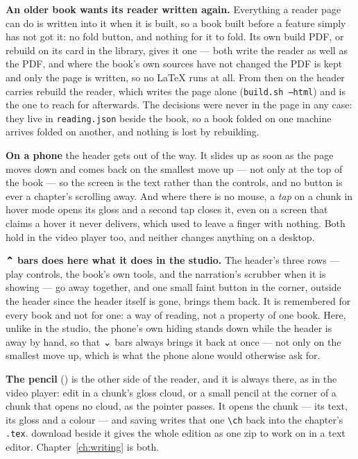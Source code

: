 \documentclass[11pt,oneside]{report}
\newcommand{\sym}[1]{{\symfont #1}}
\newcommand{\file}[1]{\texttt{#1}}
\newcommand{\key}[1]{\textsf{\small\fbox{#1}}}
\newcommand{\menu}[1]{\textsf{#1}}
\begin{document}
\textbf{An older book wants its reader written again.} Everything a reader
page can do is written into it when it is built, so a book built before a
feature simply has not got it: no \menu{fold} button, and nothing for it to
fold. Its own \menu{build PDF}, or \menu{rebuild} on its card in the library,
gives it one --- both write the reader as well as the PDF, and where the
book's own sources have not changed the PDF is kept and only the page is
written, so no LaTeX runs at all. From then on the header carries
\menu{rebuild the reader}, which writes the page alone
(\file{build.sh --html}) and is the one to reach for afterwards. The
decisions were never in the page in any case: they live in
\file{reading.json} beside the book, so a book folded on one machine arrives
folded on another, and nothing is lost by rebuilding.

\textbf{On a phone} the header gets out of the way. It slides up as soon as
the page moves down and comes back on the smallest move up --- not only at
the top of the book --- so the screen is the text rather than the controls,
and no button is ever a chapter's scrolling away. And where there is no
mouse, a \emph{tap} on a chunk in hover mode opens its gloss and a second tap
closes it, even on a screen that claims a hover it never delivers, which used
to leave a finger with nothing. Both hold in the video player too, and
neither changes anything on a desktop.

\textbf{\menu{\sym{⌃} bars} does here what it does in the studio.} The
header's three rows --- play controls, the book's own tools, and the
narration's scrubber when it is showing --- go away together, and one small
faint button in the corner, outside the header since the header itself is
gone, brings them back. It is remembered for every book and not for one: a
way of reading, not a property of one book. Here, unlike in the studio, the
phone's own hiding stands down while the header is away by hand, so that
\menu{\sym{⌄} bars} always brings it back at once --- not only on the
smallest move up, which is what the phone alone would otherwise ask for.

\textbf{The pencil} (\key{E}) is the other side of the reader, and it is
always there, as in the video player: \menu{edit} in a chunk's gloss cloud,
or a small pencil at the corner of a chunk that opens no cloud, as the
pointer passes. It opens the chunk --- its text, its gloss and a colour ---
and saving writes that one \verb|\ch| back into the chapter's \file{.tex}.
\menu{download} beside it gives the whole edition as one zip to work on in a
text editor. Chapter~\ref{ch:writing} is both.
\end{document}
